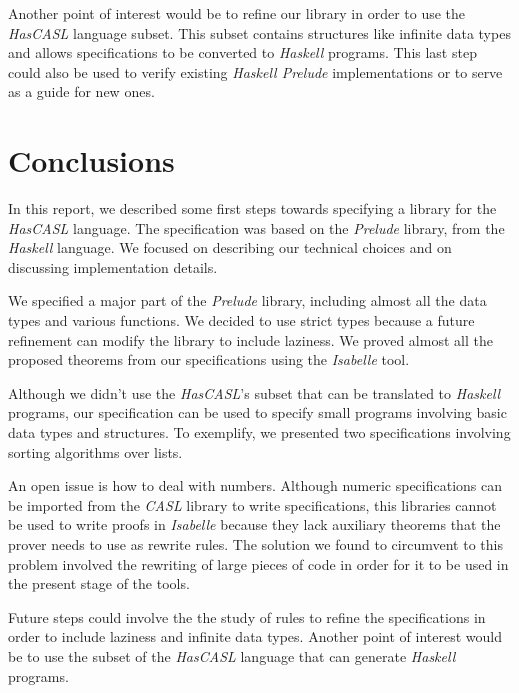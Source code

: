 \documentclass[12pt,twoside]{article}
\numberwithin{spec}{subsection}
\numberwithin{proof}{subsection}
\numberwithin{figure}{subsection}
\numberwithin{code}{subsection}
\begin{document}
Another point of interest would be to refine our library in order to use the \textit{HasCASL} language subset. This subset contains structures like infinite data types and allows specifications to be converted to \textit{Haskell} programs. This last step could also be used to verify existing \textit{Haskell Prelude} implementations or to serve as a guide for new ones.

\section{Conclusions}\label{Conclusions}
In this report, we described some first steps towards specifying a library for the \textit{HasCASL} language. The specification was based on the \textit{Prelude} library, from the \textit{Haskell} language. We focused on describing our technical choices and on discussing implementation details.

We specified a major part of the \textit{Prelude} library, including almost all the data types and various functions. We decided to use strict types because a future refinement can modify the library to include laziness. We proved almost all the proposed theorems from our specifications using the \textit{Isabelle} tool.

Although we didn't use the \textit{HasCASL}'s subset that can be translated to \textit{Haskell} programs, our specification can be used to specify small programs involving basic data types and structures. To exemplify, we presented two specifications involving sorting algorithms over lists.

An open issue is how to deal with numbers. Although numeric specifications can be imported from the \textit{CASL} library to write specifications, this libraries cannot be used to write proofs in \textit{Isabelle} because they lack auxiliary theorems that the prover needs to use as rewrite rules. The solution we found to circumvent to this problem involved the rewriting of large pieces of code in order for it to be used in the present stage of the tools.

Future steps could involve the the study of rules to refine the specifications in order to include laziness and infinite data types. Another point of interest would be to use the subset of the \textit{HasCASL} language that can generate \textit{Haskell} programs.



\clearpage

\appendix
\appendixpage
\end{document}
